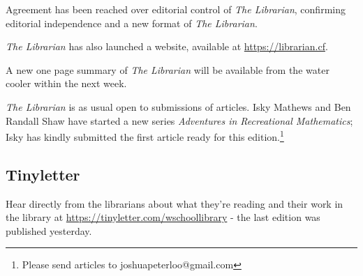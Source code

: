 Agreement has been reached over editorial control of \textit{The Librarian}, confirming editorial independence and a new format of \textit{The Librarian}.

\textit{The Librarian} has also launched a website, available at \url{https://librarian.cf}.

A new one page summary of \textit{The Librarian} will be available from the water cooler within the next week.

\textit{The Librarian} is as usual open to submissions of articles. Isky Mathews and Ben Randall Shaw have started a new series \textit{Adventures in Recreational Mathematics}; Isky has kindly submitted the first article ready for this edition.\footnote{Please send articles to joshuapeterloo@gmail.com}

\subsection{Tinyletter}

Hear directly from the librarians about what they're reading and their work in the library at \url{https://tinyletter.com/wschoollibrary} - the last edition was published yesterday.
